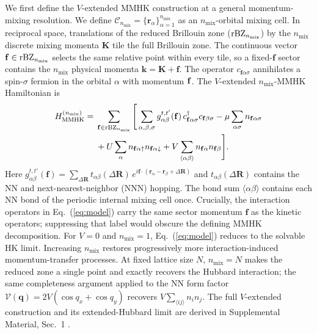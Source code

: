 \documentclass[aps,prl,reprint,superscriptaddress,nofootinbib,longbibliography]{revtex4-1}
\newcommand{\tp}{t'}
\newcommand{\nmix}{n_{\mathrm{mix}}}
\newcommand{\disp}[1]{Eq.~(\ref{#1})}
\begin{document}
We first define the $V$-extended MMHK construction at a general momentum-mixing resolution. We define $\mathcal C_{\nmix}=\{\mathbf r_\alpha\}_{\alpha=1}^{\nmix}$ as an $\nmix$-orbital mixing cell. In reciprocal space, translations of the reduced Brillouin zone (${\rm rBZ}_{\nmix}$) by the $\nmix$ discrete mixing momenta $\mathbf K$ tile the full Brillouin zone. The continuous vector $\mathbf f\in{\rm rBZ}_{\nmix}$ selects the same relative point within every tile, so a fixed-$\mathbf f$ sector contains the $\nmix$ physical momenta $\mathbf k=\mathbf K+\mathbf f$.  The operator $c_{\mathbf f\alpha\sigma}$ annihilates a spin-$\sigma$ fermion in the orbital $\alpha$ with momentum $\bf f$. The $V$-extended $\nmix$-MMHK Hamiltonian is
\begin{align}
H_{\mathrm{MMHK}}^{(\nmix)}
={}&\sum_{\mathbf f\in{\rm rBZ}_{\nmix}}
\Bigg[\sum_{\alpha,\beta,\sigma}
g_{\alpha\beta}^{t,\tp}(\mathbf f)\,
c^\dagger_{\mathbf f\alpha\sigma}c_{\mathbf f\beta\sigma}-\mu\sum_{\alpha\sigma }n_{\mathbf f\alpha\sigma} \nonumber\\[-0.15em]
&+U\sum_\alpha n_{\mathbf f\alpha\uparrow}n_{\mathbf f\alpha\downarrow}
+V\sum_{\langle\alpha\beta\rangle}n_{\mathbf f\alpha}n_{\mathbf f\beta}
\Bigg] .
\label{eq:model}
\end{align}
Here $g_{\alpha\beta}^{t,\tp}(\mathbf f)
=\sum_{\Delta\mathbf R}
t_{\alpha\beta}(\Delta\mathbf R)\,
e^{i\mathbf f\cdot(\mathbf r_\alpha-\mathbf r_\beta+\Delta\mathbf R)}$ and $t_{\alpha\beta}(\Delta\mathbf R)$ contains the NN and next-nearest-neighbor (NNN) hopping. The bond sum $\langle\alpha\beta\rangle$ contains each NN bond of the periodic internal mixing cell once. Crucially, the interaction operators in \disp{eq:model} carry the same sector momentum $\mathbf f$ as the kinetic operators; suppressing that label would obscure the defining MMHK decomposition. For $V=0$ and $\nmix=1$, \disp{eq:model} reduces to the solvable HK limit. Increasing $\nmix$ restores progressively more interaction-induced momentum-transfer processes. At fixed lattice size $N$, $\nmix=N$ makes the reduced zone a single point and exactly recovers the Hubbard interaction; the same completeness argument applied to the NN form factor $\mathcal V(\mathbf q)=2V(\cos q_x+\cos q_y)$ recovers $V\sum_{\langle ij\rangle}n_i n_j$. The full $V$-extended construction and its extended-Hubbard limit are derived in Supplemental Material, Sec.~1 \cite{mai2026twisting}.
\end{document}
